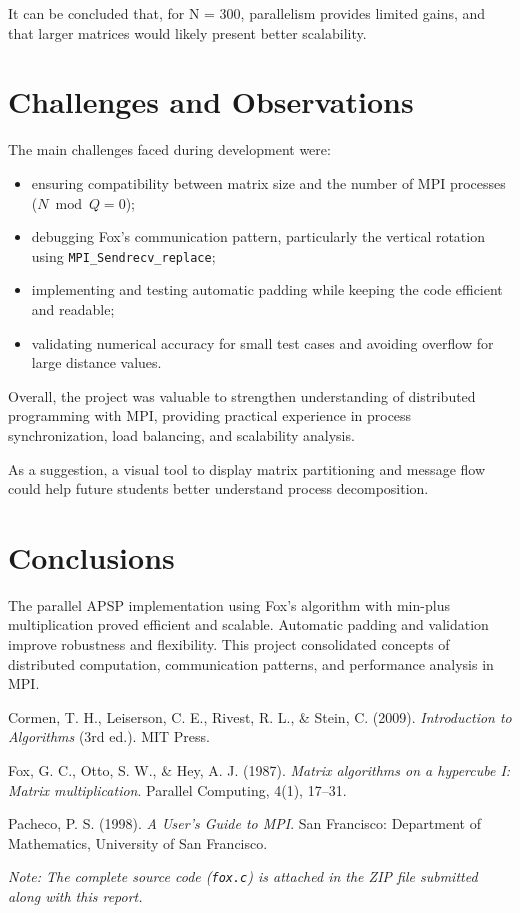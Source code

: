 \documentclass[10pt,a4paper]{article}
\begin{document}
It can be concluded that, for N = 300, parallelism provides limited gains, and that larger matrices would likely present better scalability.

\section{Challenges and Observations}
The main challenges faced during development were:
\begin{itemize}
  \item ensuring compatibility between matrix size and the number of MPI processes (\(N \bmod Q = 0\));
  \item debugging Fox's communication pattern, particularly the vertical rotation using \texttt{MPI\_Sendrecv\_replace};
  \item implementing and testing automatic padding while keeping the code efficient and readable;
  \item validating numerical accuracy for small test cases and avoiding overflow for large distance values.
\end{itemize}

Overall, the project was valuable to strengthen understanding of distributed programming with MPI, providing practical experience in process synchronization, load balancing, and scalability analysis.
 
As a suggestion, a visual tool to display matrix partitioning and message flow could help future students better understand process decomposition.

\section{Conclusions}
The parallel APSP implementation using Fox’s algorithm with min-plus multiplication proved efficient and scalable.  
Automatic padding and validation improve robustness and flexibility.  
This project consolidated concepts of distributed computation, communication patterns, and performance analysis in MPI.

\begin{thebibliography}{9}
Cormen, T. H., Leiserson, C. E., Rivest, R. L., \& Stein, C. (2009).
\textit{Introduction to Algorithms} (3rd ed.).
MIT Press.

Fox, G. C., Otto, S. W., \& Hey, A. J. (1987).
\textit{Matrix algorithms on a hypercube I: Matrix multiplication}.
Parallel Computing, 4(1), 17–31.

Pacheco, P. S. (1998).
\textit{A User's Guide to MPI}.
San Francisco: Department of Mathematics, University of San Francisco.
  \end{thebibliography}

\vspace{0.3cm}
  
\textit{Note: The complete source code (\texttt{fox.c}) is attached in the ZIP file submitted along with this report.}
\end{document}
